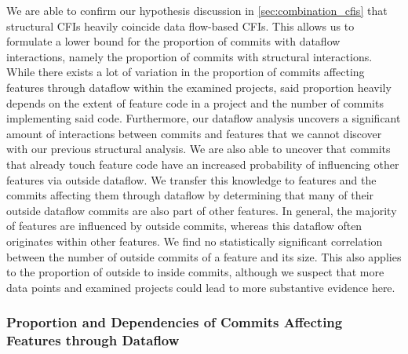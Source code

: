 We are able to confirm our hypothesis discussion in \autoref{sec:combination_cfis} that structural CFIs heavily coincide data flow-based CFIs.
This allows us to formulate a lower bound for the proportion of commits with dataflow interactions, namely the proportion of commits with structural interactions.
While there exists a lot of variation in the proportion of commits affecting features through dataflow within the examined projects, said proportion heavily depends on the extent of feature code in a project and the number of commits implementing said code.
Furthermore, our dataflow analysis uncovers a significant amount of interactions between commits and features that we cannot discover with our previous structural analysis.
We are also able to uncover that commits that already touch feature code have an increased probability of influencing other features via outside dataflow.
We transfer this knowledge to features and the commits affecting them through dataflow by determining that many of their outside dataflow commits are also part of other features.
In general, the majority of features are influenced by outside commits, whereas this dataflow often originates within other features.
We find no statistically significant correlation between the number of outside commits of a feature and its size.
This also applies to the proportion of outside to inside commits, although we suspect that more data points and examined projects could lead to more substantive evidence here.

\subsubsection*{Proportion and Dependencies of Commits Affecting Features through Dataflow}


